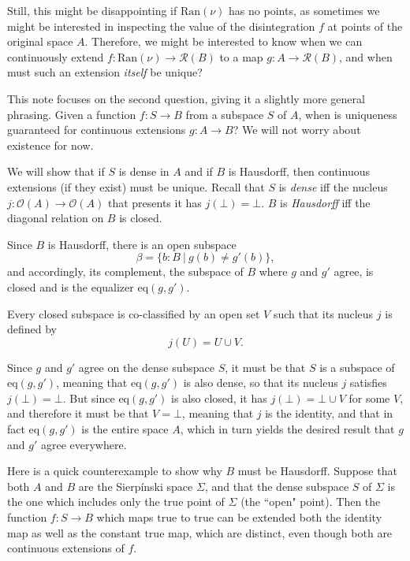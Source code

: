 Still, this might be disappointing if $\text{Ran}(\nu)$ has no points, as
sometimes we might be interested in inspecting the value of the disintegration
$f$ at points of the original space $A$. Therefore, we might be interested to
know when we can continuously extend $f : \text{Ran}(\nu) \to \mathcal{R}(B)$
to a map $g : A \to \mathcal{R}(B)$, and when must such an extension \emph{itself}
be unique?

This note focuses on the second question, giving it a slightly more general
phrasing. Given a function $f : S \to B$ from a subspace $S$ of $A$, when is
uniqueness guaranteed for continuous extensions $g : A \to B$? We will not
worry about existence for now.

We will show that if $S$ is dense in $A$ and if $B$ is Hausdorff, then
continuous extensions (if they exist) must be unique. Recall that $S$ is 
\emph{dense} iff the nucleus $j : \mathcal{O}(A) \to \mathcal{O}(A)$ that presents
it has $j(\bot) = \bot$. $B$ is \emph{Hausdorff} iff the diagonal relation on $B$
is closed.

Since $B$ is Hausdorff, there is an open subspace
$$ \beta = \{ b : B \ |\ g(b) \neq g'(b) \}, $$
and accordingly, its complement, the subspace of $B$ where $g$ and $g'$ agree,
is closed and is the equalizer $\text{eq}(g, g')$.

Every closed subspace is co-classified by an open set $V$ such that its nucleus
$j$ is defined by 
$$j(U) = U \cup V.$$

Since $g$ and $g'$ agree on the dense subspace $S$, it must be that $S$
is a subspace of $\text{eq}(g, g')$, meaning that $\text{eq}(g, g')$ is also
dense, so that its nucleus $j$ satisfies $j(\bot) = \bot$. But since
$\text{eq}(g, g')$ is also closed, it has $j(\bot) = \bot \cup V$ for some $V$,
and therefore it must be that $V = \bot$, meaning that $j$ is the identity,
and that in fact $\text{eq}(g, g')$ is the entire space $A$, which in
turn yields the desired result that $g$ and $g'$ agree everywhere.

Here is a quick counterexample to show why $B$ must be Hausdorff.
Suppose that both
$A$ and $B$ are the Sierp\'inski space $\Sigma$, and that the dense subspace
$S$ of $\Sigma$ is the one which includes only the $\text{true}$ point of
$\Sigma$ (the ``open" point). Then the function $f : S \to B$ which maps
$\text{true}$ to $\text{true}$ can be extended both the identity map as well
as the constant $\text{true}$ map, which are distinct, even
though both are continuous extensions of $f$.

